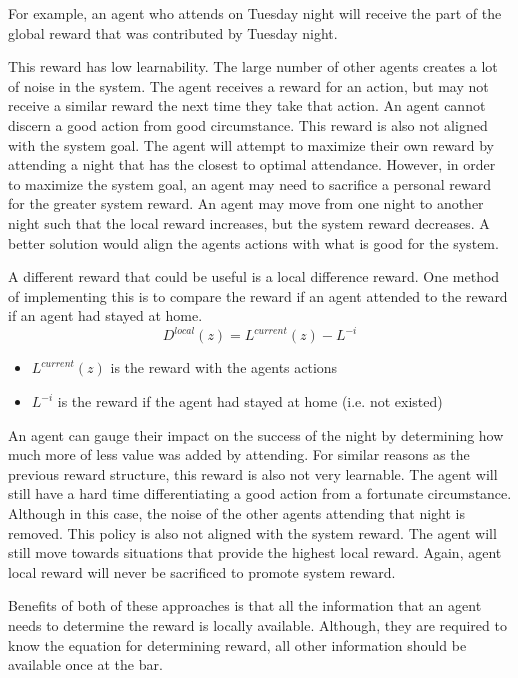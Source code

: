 \documentclass[letterpaper, 10 pt, conference]{ieeeconf}
\begin{document}
For example, an agent who attends on Tuesday night will receive the part of the global reward that was contributed by Tuesday night.

This reward has low learnability.  The large number of other agents creates a lot of noise in the system.  The agent receives a reward for an action, but may not receive a similar reward the next time they take that action.  An agent cannot discern a good action from good circumstance.  This reward is also not aligned with the system goal.  The agent will attempt to maximize their own reward by attending a night that has the closest to optimal attendance.  However, in order to maximize the system goal, an agent may need to sacrifice a personal reward for the greater system reward.  An agent may move from one night to another night such that the local reward increases, but the system reward decreases.  A better solution would align the agents actions with what is good for the system.

A different reward that could be useful is a local difference reward.  One method of implementing this is to compare the reward if an agent attended to the reward if an agent had stayed at home.  
\begin{equation}
    D^{local}(z) = L^{current}(z) - L^{-i}
\end{equation}
\begin{itemize}
    \item $L^{current}(z)$ is the reward with the agents actions
    \item $L^{-i}$ is the reward if the agent had stayed at home (i.e. not existed)
\end{itemize}

An agent can gauge their impact on the success of the night by determining how much more of less value was added by attending.  For similar reasons as the previous reward structure, this reward is also not very learnable.  The agent will still have a hard time differentiating a good action from a fortunate circumstance.  Although in this case, the noise of the other agents attending that night is removed.  This policy is also not aligned with the system reward.  The agent will still move towards situations that provide the highest local reward. Again, agent local reward will never be sacrificed to promote system reward.


 Benefits of both of these approaches is that all the information that an agent needs to determine the reward is locally available.  Although, they are required to know the equation for determining reward, all other information should be available once at the bar.
\end{document}

